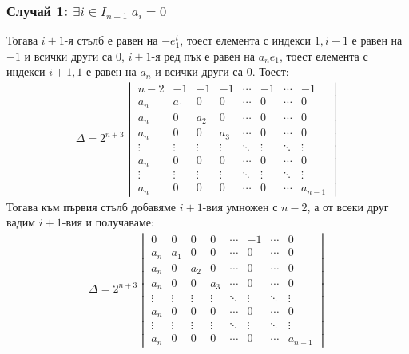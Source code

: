 \documentclass[a4paper, 12pt, oneside]{article}
\begin{document}
\subsubsection*{Случай 1: \(\exists i \in I_{n - 1} \; a_i = 0\)}
Тогава \(i + 1\)-я стълб е равен на \(-e_1^t\), тоест елемента с индекси \(1, i + 1\) е равен на \(-1\) и всички други са \(0\),
\(i + 1\)-я ред пък е равен на \(a_n e_1\), тоест елемента с индекси \(i + 1, 1\) е равен на \(a_n\) и всички други са \(0\).
Тоест:
\begin{align*}
\Delta = 2^{n + 3}\begin{vmatrix}
    n - 2  & -1     & -1     & -1     & \cdots & -1     & \cdots & -1     \\
    a_n    & a_1    & 0      & 0      & \cdots & 0      & \cdots & 0      \\
    a_n    & 0      & a_2    & 0      & \cdots & 0      & \cdots & 0      \\
    a_n    & 0      & 0      & a_3    & \cdots & 0      & \cdots & 0      \\
    \vdots & \vdots & \vdots & \vdots & \ddots & \vdots & \ddots & \vdots \\
    a_n    & 0      & 0      & 0      & \cdots & 0      & \cdots & 0      \\
    \vdots & \vdots & \vdots & \vdots & \ddots & \vdots & \ddots & \vdots \\
    a_n    & 0      & 0      & 0      & \cdots & 0      & \cdots & a_{n - 1}
\end{vmatrix}
\end{align*}
Тогава към първия стълб добавяме \(i + 1\)-вия умножен с \(n - 2\), а от всеки друг вадим \(i + 1\)-вия и получаваме:
\begin{align*}
\Delta = 2^{n + 3}\begin{vmatrix}
    0      & 0      & 0      & 0      & \cdots & -1     & \cdots & 0      \\
    a_n    & a_1    & 0      & 0      & \cdots & 0      & \cdots & 0      \\
    a_n    & 0      & a_2    & 0      & \cdots & 0      & \cdots & 0      \\
    a_n    & 0      & 0      & a_3    & \cdots & 0      & \cdots & 0      \\
    \vdots & \vdots & \vdots & \vdots & \ddots & \vdots & \ddots & \vdots \\
    a_n    & 0      & 0      & 0      & \cdots & 0      & \cdots & 0      \\
    \vdots & \vdots & \vdots & \vdots & \ddots & \vdots & \ddots & \vdots \\
    a_n    & 0      & 0      & 0      & \cdots & 0      & \cdots & a_{n - 1}
\end{vmatrix}
\end{align*}
\end{document}
